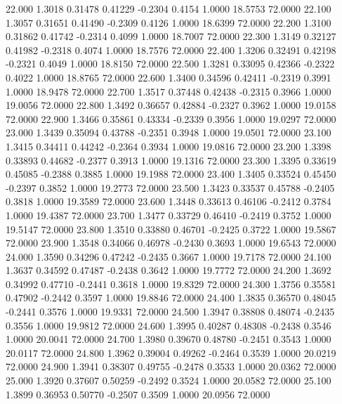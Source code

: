   22.000   1.3018   0.31478   0.41229  -0.2304   0.4154   1.0000  18.5753  72.0000
  22.100   1.3057   0.31651   0.41490  -0.2309   0.4126   1.0000  18.6399  72.0000
  22.200   1.3100   0.31862   0.41742  -0.2314   0.4099   1.0000  18.7007  72.0000
  22.300   1.3149   0.32127   0.41982  -0.2318   0.4074   1.0000  18.7576  72.0000
  22.400   1.3206   0.32491   0.42198  -0.2321   0.4049   1.0000  18.8150  72.0000
  22.500   1.3281   0.33095   0.42366  -0.2322   0.4022   1.0000  18.8765  72.0000
  22.600   1.3400   0.34596   0.42411  -0.2319   0.3991   1.0000  18.9478  72.0000
  22.700   1.3517   0.37448   0.42438  -0.2315   0.3966   1.0000  19.0056  72.0000
  22.800   1.3492   0.36657   0.42884  -0.2327   0.3962   1.0000  19.0158  72.0000
  22.900   1.3466   0.35861   0.43334  -0.2339   0.3956   1.0000  19.0297  72.0000
  23.000   1.3439   0.35094   0.43788  -0.2351   0.3948   1.0000  19.0501  72.0000
  23.100   1.3415   0.34411   0.44242  -0.2364   0.3934   1.0000  19.0816  72.0000
  23.200   1.3398   0.33893   0.44682  -0.2377   0.3913   1.0000  19.1316  72.0000
  23.300   1.3395   0.33619   0.45085  -0.2388   0.3885   1.0000  19.1988  72.0000
  23.400   1.3405   0.33524   0.45450  -0.2397   0.3852   1.0000  19.2773  72.0000
  23.500   1.3423   0.33537   0.45788  -0.2405   0.3818   1.0000  19.3589  72.0000
  23.600   1.3448   0.33613   0.46106  -0.2412   0.3784   1.0000  19.4387  72.0000
  23.700   1.3477   0.33729   0.46410  -0.2419   0.3752   1.0000  19.5147  72.0000
  23.800   1.3510   0.33880   0.46701  -0.2425   0.3722   1.0000  19.5867  72.0000
  23.900   1.3548   0.34066   0.46978  -0.2430   0.3693   1.0000  19.6543  72.0000
  24.000   1.3590   0.34296   0.47242  -0.2435   0.3667   1.0000  19.7178  72.0000
  24.100   1.3637   0.34592   0.47487  -0.2438   0.3642   1.0000  19.7772  72.0000
  24.200   1.3692   0.34992   0.47710  -0.2441   0.3618   1.0000  19.8329  72.0000
  24.300   1.3756   0.35581   0.47902  -0.2442   0.3597   1.0000  19.8846  72.0000
  24.400   1.3835   0.36570   0.48045  -0.2441   0.3576   1.0000  19.9331  72.0000
  24.500   1.3947   0.38808   0.48074  -0.2435   0.3556   1.0000  19.9812  72.0000
  24.600   1.3995   0.40287   0.48308  -0.2438   0.3546   1.0000  20.0041  72.0000
  24.700   1.3980   0.39670   0.48780  -0.2451   0.3543   1.0000  20.0117  72.0000
  24.800   1.3962   0.39004   0.49262  -0.2464   0.3539   1.0000  20.0219  72.0000
  24.900   1.3941   0.38307   0.49755  -0.2478   0.3533   1.0000  20.0362  72.0000
  25.000   1.3920   0.37607   0.50259  -0.2492   0.3524   1.0000  20.0582  72.0000
  25.100   1.3899   0.36953   0.50770  -0.2507   0.3509   1.0000  20.0956  72.0000
